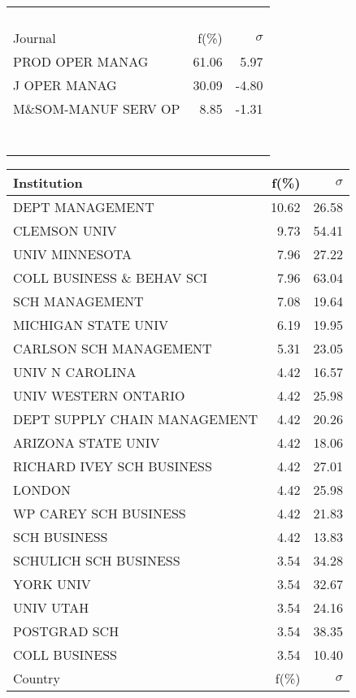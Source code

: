 \documentclass[a4paper,11pt]{report}
\begin{document}
\begin{landscape}
\begin{table}[!ht]
{\begin{tabular}{|l r  r|}
 &  & \\
 &  & \\
 &  & \\
 &  & \\
\hline
\hline
Journal & f(\%) & $\sigma$\\
\hline
PROD OPER MANAG & 61.06 & 5.97\\
J OPER MANAG & 30.09 & -4.80\\
M\&SOM-MANUF SERV OP & 8.85 & -1.31\\
 &  & \\
 &  & \\
 &  & \\
 &  & \\
 &  & \\
 &  & \\
 &  & \\
\hline
\end{tabular}
}
{\scriptsize\begin{tabular}{|l r r|}
\hline
Institution & f(\%) & $\sigma$\\
\hline
DEPT MANAGEMENT & 10.62 & 26.58\\
CLEMSON UNIV & 9.73 & 54.41\\
UNIV MINNESOTA & 7.96 & 27.22\\
COLL BUSINESS \& BEHAV SCI & 7.96 & 63.04\\
SCH MANAGEMENT & 7.08 & 19.64\\
MICHIGAN STATE UNIV & 6.19 & 19.95\\
CARLSON SCH MANAGEMENT & 5.31 & 23.05\\
UNIV N CAROLINA & 4.42 & 16.57\\
UNIV WESTERN ONTARIO & 4.42 & 25.98\\
DEPT SUPPLY CHAIN MANAGEMENT & 4.42 & 20.26\\
ARIZONA STATE UNIV & 4.42 & 18.06\\
RICHARD IVEY SCH BUSINESS & 4.42 & 27.01\\
LONDON & 4.42 & 25.98\\
WP CAREY SCH BUSINESS & 4.42 & 21.83\\
SCH BUSINESS & 4.42 & 13.83\\
SCHULICH SCH BUSINESS & 3.54 & 34.28\\
YORK UNIV & 3.54 & 32.67\\
UNIV UTAH & 3.54 & 24.16\\
POSTGRAD SCH & 3.54 & 38.35\\
COLL BUSINESS & 3.54 & 10.40\\
\hline
\hline
Country & f(\%) & $\sigma$\\

\end{tabular}}
\end{table}
\end{landscape}
\end{document}
